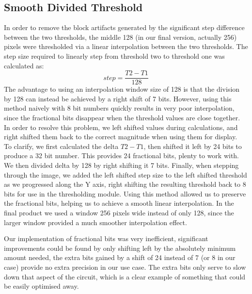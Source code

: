 \documentclass[12pt]{article}
\begin{document}
  \subsection{Smooth Divided Threshold}
  In order to remove the block artifacts generated by the significant step difference between the two thresholds, the middle 128 (in our final version, actually 256) pixels were thresholded via a linear interpolation between the two thresholds. The step size required to linearly step from threshold two to threshold one was calculated as:
      \begin{equation}
      step = \frac{T2 - T1}{128}
      \end{equation}
  The advantage to using an interpolation window size of 128 is that the division by 128 can instead be achieved by a right shift of 7 bits. However, using this method naively with 8 bit numbers quickly results in very poor interpolation, since the fractional bits disappear when the threshold values are close together. In order to resolve this problem, we left shifted values during calculations, and right shifted them back to the correct magnitude when using them for display.\\
      
  To clarify, we first calculated the delta \(T2 - T1\), then shifted it left by 24 bits to produce a 32 bit number. This provides 24 fractional bits, plenty to work with. We then divided delta by 128 by right shifting it 7 bits. Finally, when stepping through the image, we added the left shifted step size to the left shifted threshold as we progressed along the Y axis, right shifting the resulting threshold back to 8 bits for use in the thresholding module. Using this method allowed us to preserve the fractional bits, helping us to achieve a smooth linear interpolation. In the final product we used a window 256 pixels wide instead of only 128, since the larger window provided a much smoother interpolation effect.

  Our implementation of fractional bits was very inefficient, significant improvements could be found by only shifting left by the absolutely minimum amount needed, the extra bits gained by a shift of 24 instead of 7 (or 8 in our case) provide no extra precision in our use case. The extra bits only serve to slow down that aspect of the circuit, which is a clear example of something that could be easily optimised away.
  
\end{document}
